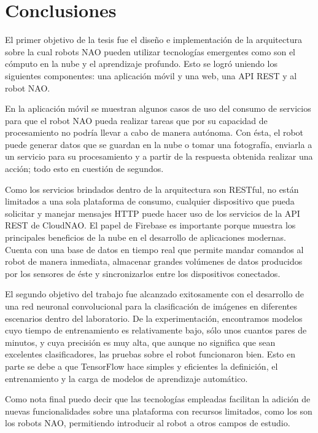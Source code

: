 \chapter*{Conclusiones}
\label{\detokenize{conclusion:cloudnao-una-arquitectura-de-software-para-la-integracion-de-computo-en-la-nube-con-robots-nao}}\label{\detokenize{conclusion:conclusion}}\label{\detokenize{conclusion::doc}}


El primer objetivo de la tesis fue el diseño e 
implementación de
la arquitectura sobre la cual robots NAO pueden
utilizar tecnologías emergentes como son el cómputo en la nube
y el aprendizaje 
profundo. Esto se logró uniendo los siguientes componentes:
una aplicación móvil y una web, una API REST y al robot NAO.

En la aplicación
móvil se muestran algunos casos de uso del consumo de
servicios para que el robot NAO pueda realizar tareas
que por su capacidad de procesamiento no podría 
llevar a cabo de manera autónoma.
Con ésta, el robot puede generar datos que
se guardan en la nube o tomar una fotografía,
enviarla a un servicio para su procesamiento y a partir
de la respuesta obtenida realizar una acción; todo
esto en cuestión de segundos.

Como los servicios brindados dentro de la arquitectura son 
RESTful, no están limitados a una sola plataforma
de consumo, cualquier dispositivo que pueda solicitar y
manejar mensajes HTTP puede hacer uso de los servicios
de la API REST de CloudNAO.
El papel de Firebase es importante porque muestra
los principales beneficios de la nube en el desarrollo
de aplicaciones modernas. Cuenta con una base de datos en tiempo
real que permite mandar comandos al robot de manera
inmediata, almacenar grandes volúmenes de datos
producidos por los sensores de éste y sincronizarlos entre los dispositivos
conectados.

El segundo objetivo del trabajo fue 
alcanzado exitosamente con el desarrollo
de una red neuronal convolucional para la clasificación
de imágenes en diferentes escenarios dentro del laboratorio.
De la experimentación, encontramos modelos
cuyo tiempo de entrenamiento es relativamente bajo, sólo unos 
cuantos pares de minutos, y cuya precisión es muy alta, que 
aunque no significa que sean excelentes clasificadores,
las pruebas sobre el robot funcionaron bien.
Esto en parte se debe a que
TensorFlow hace simples y eficientes
la definición, el entrenamiento y la carga de modelos de 
aprendizaje automático. 

Como nota final puedo decir que las tecnologías empleadas
facilitan la adición
de nuevas funcionalidades sobre una plataforma con recursos
limitados, como los son los robots NAO,
permitiendo introducir al robot a otros campos de estudio.
